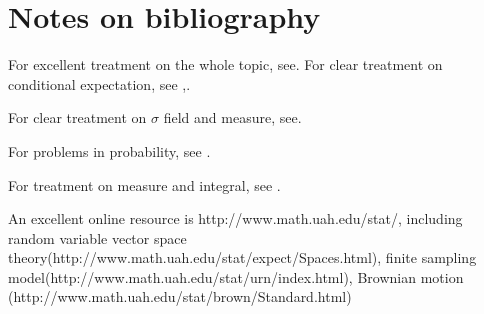 \begin{refsection}
\begin{remark}[interpretation]
\end{remark}


\section{Notes on bibliography}

For excellent treatment on the whole topic, see\cite{shiryaev1996probability}\cite{feller2008introduction}.
For clear treatment on conditional expectation, see \cite{brzezniak1999basic},\cite{mikosch1998elementary}.

For clear treatment on $\sigma$ field and measure, see\cite{dineen2013probability}\cite{koralov2007theory}.

For problems in probability, see \cite{capinski2013probability}\cite{grimmett2001one}.

For treatment on measure and integral, see \cite{capinski2013measure}.



An excellent online resource is http://www.math.uah.edu/stat/, including random variable vector space theory(http://www.math.uah.edu/stat/expect/Spaces.html), finite sampling model(http://www.math.uah.edu/stat/urn/index.html), Brownian motion (http://www.math.uah.edu/stat/brown/Standard.html)

\printbibliography
\end{refsection}
